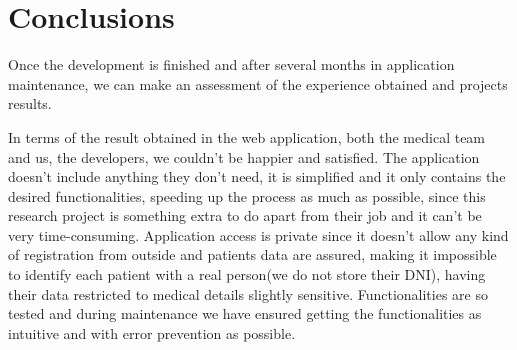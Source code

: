 \chapter*{Conclusions}


    Once the development is finished and after several months in application maintenance, we can make an assessment of the experience obtained  and projects results. \newline

    In terms of the result obtained in the web application, both the medical team and us, the developers, we couldn't be happier and satisfied. The application doesn't include anything they don't need, it is simplified and it only contains the desired functionalities, speeding up the process as much as possible, since this research project is something extra to do apart from their job and it can't be very time-consuming. Application access is private since it doesn't allow any kind of registration from outside and patients data are assured, making it impossible to identify each patient with a real person(we do not store their DNI), having their data restricted  to medical details slightly sensitive. Functionalities are so tested and during maintenance we have ensured getting the functionalities as intuitive and with error prevention as possible. \newline
    
    
    
    
    
    